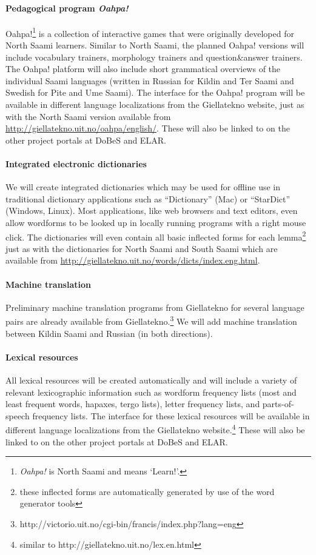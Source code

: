 \documentclass[a4paper,12pt]{article}
\begin{document}
\paragraph{Pedagogical program \textit{Oahpa!}}
Oahpa!\footnote{{\it Oahpa!} is North Saami and means ‘Learn!’.} is a collection of interactive games that were originally developed for North Saami learners. Similar to North Saami, the planned Oahpa! versions will include vocabulary trainers, morphology trainers and question\&answer trainers. The Oahpa! platform will also include short grammatical overviews of the individual Saami languages (written in Russian for Kildin and Ter Saami and Swedish for Pite and Ume Saami). The interface for the Oahpa! program will be available in different language localizations from the Giellatekno website, just as with the North Saami version available from \url{http://giellatekno.uit.no/oahpa/english/}. These will also be linked to on the other project portals at DoBeS and ELAR.

\paragraph{Integrated electronic dictionaries}
We will create integrated dictionaries which may be used for offline use in traditional dictionary applications such as “Dictionary” (Mac) or “StarDict” (Windows, Linux). Most applications, like web browsers and text editors, even allow wordforms to be looked up in locally running programs with a right mouse click. The dictionaries will even contain all basic inflected forms for each lemma\footnote{these inflected forms are automatically generated by use of the word generator tools} just as with the dictionaries for North Saami and South Saami which are available from \url{http://giellatekno.uit.no/words/dicts/index.eng.html}.

\paragraph{Machine translation}
Preliminary machine translation programs from Giellatekno for several language pairs are already available from Giellatekno.\footnote{http://victorio.uit.no/cgi-bin/francis/index.php?lang=eng} We will add machine translation between Kildin Saami and Russian (in both directions).

\paragraph{Lexical resources}
All lexical resources will be created automatically and will include a variety of relevant lexicographic information such as wordform frequency lists (most and least frequent words, hapaxes, tergo lists), letter frequency lists, and parts-of-speech frequency lists. The interface for these lexical resources will be available in different language localizations from the Giellatekno website.\footnote{similar to http://giellatekno.uit.no/lex.en.html} These will also be linked to on the other project portals at DoBeS and ELAR.
\end{document}

